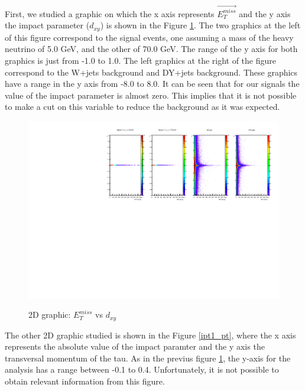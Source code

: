 First, we studied a graphic on which the x axis 
represents $\vec{E_T^{miss}}$ and the y axis the impact parameter ($d_{xy}$) is shown in the Figure \ref{ipt1_MET}. The two graphics at the left of this figure correspond to the signal events, one 
assuming a mass of the heavy neutrino of 5.0 GeV, and the other of 70.0 GeV. The range of the y axis for both graphics is just from -1.0 to 1.0. The left graphics at the right of the figure correspond 
to the W+jets background and DY+jets background. These graphics have a range in the y axis from -8.0 to 8.0. It can be seen that for our signals the value of the impact parameter is almost zero. 
This implies that it is not possible to make a cut on this variable to reduce the background as it was expected. 
 
 \begin{figure}[h] 
 \centering
 \caption{2D graphic: $E_T^{miss}$ vs $d_{xy}$}
 \includegraphics[width=1.15\textwidth]{./Capitulos/Analysis/c1} 
 \label{ipt1_MET}
 \end{figure}
 
The other 2D graphic studied is shown in the Figure \ref{ipt1_pt}, where the x axis represents the absolute value of the impact paramter and the y axis the transversal momentum of the tau. As in the previus figure \ref{ipt1_MET}, the y-axis for the analysis has a range between -0.1 to 0.4. Unfortunately, it is not possible to obtain relevant information from this figure.
 
